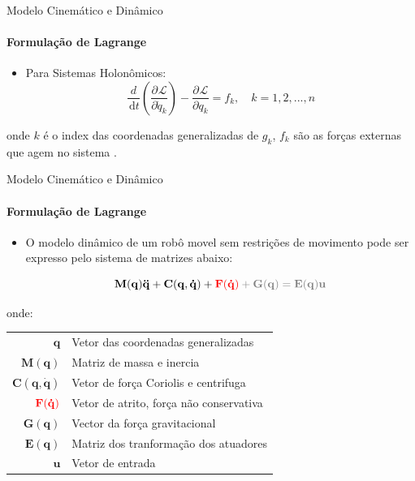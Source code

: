 \documentclass{beamer}
\newcommand{\df}[1]{\,\mathrm{d}#1}
\newcommand{\parcial}[3]{\dfrac{\partial^{#1}#2}{\partial #3^{#1}}}
\begin{document}
\begin{frame}{Modelo Cinemático e Dinâmico}
    \framesubtitle{Formulação de Lagrange}

    \begin{itemize}
        \item Para Sistemas Holonômicos:
              \begin{equation}
                  \frac{d}{\df{t}}\left( \parcial{}{\mathcal{L}}{\dot{q}_k}\right)
                  -\parcial{}{\mathcal{L}}{q_k}
                  = f_k, \quad k = 1,2,...,n
              \end{equation}

    \end{itemize}
    \begin{block}{}
        onde $k$ é o index das coordenadas generalizadas de $g_k$, $f_k$ são as forças externas que agem no sistema .
    \end{block} 
\end{frame}


\begin{frame}{Modelo Cinemático e Dinâmico}
    \framesubtitle{Formulação de Lagrange}
    \begin{itemize}
        \item O modelo dinâmico de um robô movel sem restrições de movimento pode ser expresso pelo sistema de matrizes abaixo:

              \begin{equation}
                  \mathbf{M(q)\ddot{q}+ C(q, \dot{q})+ \color{red}{F(\dot{q})}\color{gray}+G(q) = E(q)u}
              \end{equation}
    \end{itemize}

    \begin{block}{}
        \scriptsize{
            onde:
            \begin{tabular}{ r | l }
                $\mathbf{q}$               & Vetor das coordenadas generalizadas   \\
                $\mathbf{M(q)}$            & Matriz de massa e inercia             \\
                $\mathbf{C(q, \dot{q})}$   & Vetor de força Coriolis e centrifuga  \\
                $\color{red}{\mathbf{F(\dot{q})}}$      & Vetor de atrito, força não conservativa\footnotemark\\
                $\mathbf{G(q)}$            & Vector da força gravitacional         \\
                $\mathbf{E(q)}$            & Matriz dos tranformação dos atuadores \\
                $\mathbf{u}$               & Vetor de entrada                      \\
            \end{tabular}}
    \end{block}
\end{frame}
\end{document}
